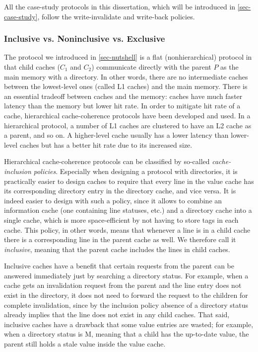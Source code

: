 All the case-study protocols in this dissertation, which will be introduced in \autoref{sec-case-study}, follow the write-invalidate and write-back policies.

\subsubsection{Inclusive vs. Noninclusive vs. Exclusive}

The protocol we introduced in \autoref{sec-nutshell} is a flat (nonhierarchical) protocol in that child caches ($C_1$ and $C_2$) communicate directly with the parent $P$ as the main memory with a directory.
In other words, there are no intermediate caches between the lowest-level ones (called L1 caches) and the main memory.
There is an essential tradeoff between caches and the memory: caches have much faster latency than the memory but lower hit rate.
In order to mitigate hit rate of a cache, hierarchical cache-coherence protocols have been developed and used.
In a hierarchical protocol, a number of L1 caches are clustered to have an L2 cache as a parent, and so on.
A higher-level cache usually has a lower latency than lower-level caches but has a better hit rate due to its increased size.

Hierarchical cache-coherence protocols can be classified by so-called \emph{cache-inclusion policies}.
Especially when designing a protocol with directories, it is practically easier to design caches to require that every line in the value cache has its corresponding directory entry in the directory cache, and vice versa.
It is indeed easier to design with such a policy, since it allows to combine an information cache (one containing line statuses, etc.) and a directory cache into a single cache, which is more space-efficient by not having to store tags in each cache.
This policy, in other words, means that whenever a line is in a child cache there is a corresponding line in the parent cache as well.
We therefore call it \emph{inclusive}, meaning that the parent cache includes the lines in child caches.

Inclusive caches have a benefit that certain requests from the parent can be answered immediately just by searching a directory status.
For example, when a cache gets an invalidation request from the parent and the line entry does not exist in the directory, it does not need to forward the request to the children for complete invalidation, since by the inclusion policy absence of a directory status already implies that the line does not exist in any child caches.
That said, inclusive caches have a drawback that some value entries are wasted; for example, when a directory status is M, meaning that a child has the up-to-date value, the parent still holds a stale value inside the value cache.

